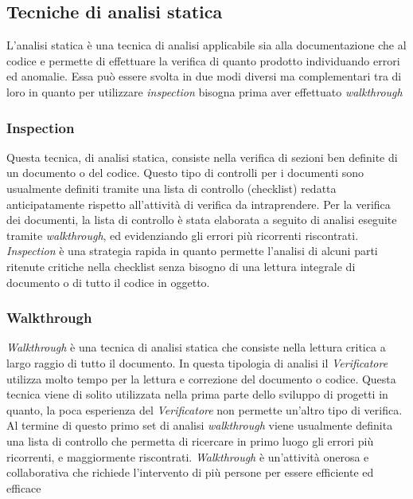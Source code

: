 \subsection{Tecniche di analisi statica}
L'analisi statica è una tecnica di analisi applicabile sia alla documentazione che al codice e permette di effettuare la verifica di quanto prodotto individuando errori ed anomalie. Essa può essere svolta in due modi diversi ma complementari tra di loro in quanto per utilizzare \textit{inspection} bisogna prima aver effettuato \textit{walkthrough}
\subsubsection{Inspection}
Questa tecnica, di analisi statica, consiste nella verifica di sezioni ben definite di un documento o del codice. Questo tipo di controlli per i documenti sono usualmente definiti tramite una lista di controllo (checklist) redatta anticipatamente rispetto all'attività di verifica da intraprendere. Per la verifica dei documenti, la lista di controllo è stata elaborata a seguito di analisi eseguite tramite \textit{walkthrough}, ed evidenziando gli errori più ricorrenti riscontrati. \textit{Inspection} è una strategia rapida in quanto permette l'analisi di alcuni parti ritenute critiche nella checklist senza bisogno di una lettura integrale di documento o di tutto il codice in oggetto.
\subsubsection{Walkthrough}
\textit{Walkthrough} è una tecnica di analisi statica che consiste nella lettura critica a largo raggio di tutto il documento. In questa tipologia di analisi il \textit{Verificatore} utilizza molto tempo per la lettura e correzione del documento o codice. Questa tecnica viene di solito utilizzata nella prima parte dello sviluppo di progetti in quanto, la poca esperienza del \textit{Verificatore} non permette un'altro tipo di verifica. Al termine di questo primo set di analisi \textit{walkthrough} viene usualmente definita una lista di controllo che permetta di ricercare in primo luogo gli errori più ricorrenti, e maggiormente riscontrati. \textit{Walkthrough} è un'attività onerosa e collaborativa che richiede l'intervento di più persone per essere efficiente ed efficace
